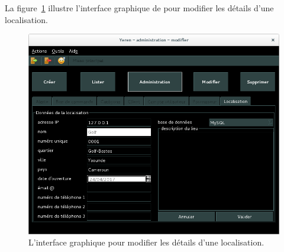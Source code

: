 
\newpage
{}

La figure~\ref{fig:admin-localisations-modifier} illustre
l'interface graphique de \yeroth pour modifier les d\'etails
d'une localisation.\\

\begin{figure}[!htpb]
	\centering
	\includegraphics[scale=0.45]{images/localisation-modifier.png}
	\caption{L'interface graphique pour modifier les d\'etails
			d'une localisation.}
	\label{fig:admin-localisations-modifier}
\end{figure}

